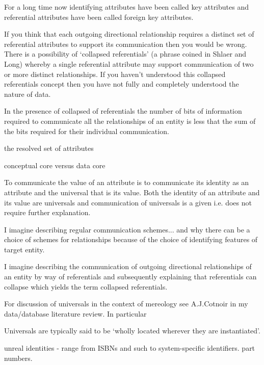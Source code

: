 \mynote For a long time now identifying attributes have been called key attributes and referential attributes have been called foreign key attributes. 

\mynote If you think that each outgoing directional relationship requires a distinct set of referential attributes to support its communication then you would be wrong. 
There is a possibility of `collapsed referentials' (a phrase coined in Shlaer and Long) whereby a single referential attribute may support communication of two or more distinct relationships. If you haven't understood this collapsed referentials concept then you have not  fully and completely understood the nature of data. 

\mynote In the presence of collapsed of referentials the number of bits of information required to communicate all the relationships of an entity is less that the sum of the bits required for their individual communication. 

\mynote the resolved set of attributes

\mynote conceptual core versus data core


\begin{oldtt}
\mynote To communicate the value of an attribute is to communicate its identity as an attribute and the universal that is its value. Both the identity of an attribute and its value are universals and communication of universals is a given i.e. does not require further explanation. 
\end{oldtt}



\begin{noteforfuture}
I imagine describing regular communication schemes... and why there can be a choice of schemes for relationships because of the choice of identifying features of target entity. 
\end{noteforfuture}
\begin{noteforfuture}
I imagine describing the communication of outgoing directional relationships of an entity by way of referentials and subsequently explaining that referentials can collapse which yields the term collapsed referentials.
\end{noteforfuture}
\begin{noteforfuture}
For discussion of universals in  the context of mereology see A.J.Cotnoir in my data/database literature review. In particular
\begin{erquote}
Universals are typically said to be ‘wholly located wherever they are instantiated’.
\end{erquote}
\end{noteforfuture}

\begin{noteforfuture}
unreal identities - range from ISBNs and such to system-specific identifiers. part numbers.
\end{noteforfuture}



 
